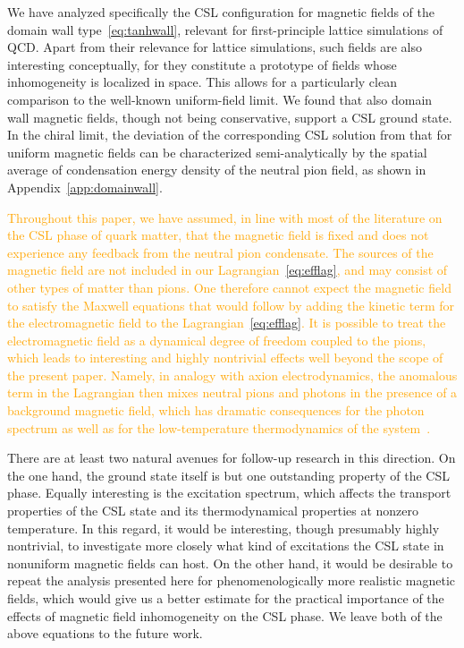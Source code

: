 \documentclass[pdflatex,iicol,sn-mathphys-num]{sn-jnl}
\begin{document}
We have analyzed specifically the CSL configuration for magnetic fields of the domain wall type~\eqref{eq:tanhwall}, relevant for first-principle lattice simulations of QCD. Apart from their relevance for lattice simulations, such fields are also interesting conceptually, for they constitute a prototype of fields whose inhomogeneity is localized in space. This allows for a particularly clean comparison to the well-known uniform-field limit. We found that also domain wall magnetic fields, though not being conservative, support a CSL ground state. In the chiral limit, the deviation of the corresponding CSL solution from that for uniform magnetic fields can be characterized semi-analytically by the spatial average of condensation energy density of the neutral pion field, as shown in Appendix~\ref{app:domainwall}.

\textcolor{orange}{Throughout this paper, we have assumed, in line with most of the literature on the CSL phase of quark matter, that the magnetic field is fixed and does not experience any feedback from the neutral pion condensate. The sources of the magnetic field are not included in our Lagrangian~\eqref{eq:efflag}, and may consist of other types of matter than pions. One therefore cannot expect the magnetic field to satisfy the Maxwell equations that would follow by adding the kinetic term for the electromagnetic field to the Lagrangian~\eqref{eq:efflag}. It is possible to treat the electromagnetic field as a dynamical degree of freedom coupled to the pions, which leads to interesting and highly nontrivial effects well beyond the scope of the present paper. Namely, in analogy with axion electrodynamics, the anomalous term in the Lagrangian then mixes neutral pions and photons in the presence of a background magnetic field, which has dramatic consequences for the photon spectrum as well as for the low-temperature thermodynamics of the system~\cite{Yamamoto:2015maz,Brauner:2017mui}.}

There are at least two natural avenues for follow-up research in this direction. On the one hand, the ground state itself is but one outstanding property of the CSL phase. Equally interesting is the excitation spectrum, which affects the transport properties of the CSL state and its thermodynamical properties at nonzero temperature. In this regard, it would be interesting, though presumably highly nontrivial, to investigate more closely what kind of excitations the CSL state in nonuniform magnetic fields can host. On the other hand, it would be desirable to repeat the analysis presented here for phenomenologically more realistic magnetic fields, which would give us a better estimate for the practical importance of the effects of magnetic field inhomogeneity on the CSL phase. We leave both of the above equations to the future work.
\end{document}
